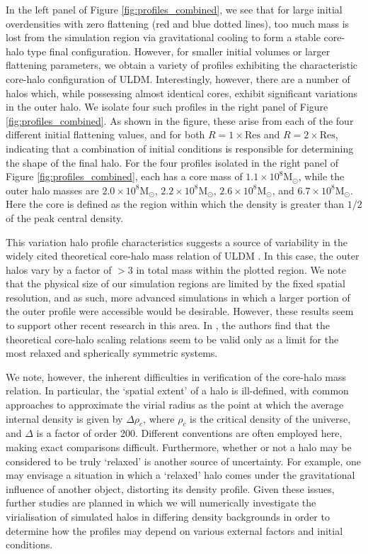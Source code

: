 \documentclass[a4paper,11pt]{article}
\begin{document}
In the left panel of Figure \ref{fig:profiles_combined}, we see that for large initial overdensities with zero flattening (red and blue dotted lines), too much mass is lost from the simulation region via gravitational cooling to form a stable core-halo type final configuration. However, for smaller initial volumes or larger flattening parameters, we obtain a variety of profiles exhibiting the characteristic core-halo configuration of ULDM. Interestingly, however, there are a number of halos which, while possessing almost identical cores, exhibit significant variations in the outer halo. We isolate four such profiles in the right panel of Figure \ref{fig:profiles_combined}. As shown in the figure, these arise from each of the four different initial flattening values, and for both $R = 1\times\mathrm{Res}$ and $R = 2\times\mathrm{Res}$, indicating that a combination of initial conditions is responsible for determining the shape of the final halo. For the four profiles isolated in the right panel of Figure \ref{fig:profiles_combined}, each has a core mass of $1.1\times 10^{8}$M$_\odot$, while the outer halo masses are $2.0\times 10^{8}$M$_\odot$, $2.2\times 10^{8}$M$_\odot$, $2.6\times 10^{8}$M$_\odot$, and $6.7\times 10^{8}$M$_\odot$. Here the core is defined as the region within which the density is greater than $1/2$ of the peak central density. 

This variation halo profile characteristics suggests a source of variability in the widely cited theoretical core-halo mass relation of ULDM \cite{Schive:2014hza}. In this case, the outer halos vary by a factor of $>3$ in total mass within the plotted region. We note that the physical size of our simulation regions are limited by the fixed spatial resolution, and as such, more advanced simulations in which a larger portion of the outer profile were accessible would be desirable. However, these results seem to support other recent research in this area. In \cite{Nori:2020jzx}, the authors find that the theoretical core-halo scaling relations seem to be valid only as a limit for the most relaxed and spherically symmetric systems. 

We note, however, the inherent difficulties in verification of the core-halo mass relation. In particular, the `spatial extent' of a halo is ill-defined, with common approaches to approximate the virial radius as the point at which the average internal density is given by $\Delta\rho_c$, where $\rho_c$ is the critical density of the universe, and $\Delta$ is a factor of order 200. Different conventions are often employed here, making exact comparisons difficult. Furthermore, whether or not a halo may be considered to be truly `relaxed' is another source of uncertainty. For example, one may envisage a situation in which a `relaxed' halo comes under the gravitational influence of another object, distorting its density profile. Given these issues, further studies are planned in which we will numerically investigate the virialisation of simulated halos in differing density backgrounds in order to determine how the profiles may depend on various external factors and initial conditions. 
\end{document}
